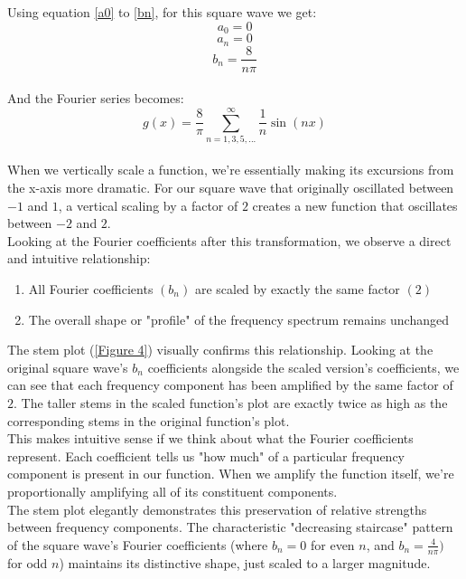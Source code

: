 \documentclass{article}
\begin{document}
Using equation \ref{a0} to \ref{bn}, for this square wave we get:
    \begin{equation}
    a_0 = 0
    \end{equation}
    \begin{equation}
    a_n = 0
    \end{equation}
    \begin{equation}
    b_n = \frac{8}{n\pi}
    \end{equation}\\
And the Fourier series becomes:
    \begin{equation}
g(x) = \frac{8}{\pi} \sum_{n=1,3,5,...}^{\infty} \frac{1}{n} \sin\left(nx\right)
    \end{equation}\\
    
When we vertically scale a function, we're essentially making its excursions from the x-axis more dramatic. For our square wave that originally oscillated between $-1$ and $1$, a vertical scaling by a factor of $2$ creates a new function that oscillates between $-2$ and $2$.\\

Looking at the Fourier coefficients after this transformation, we observe a direct and intuitive relationship:\\

\begin{enumerate}
\item All Fourier coefficients $(b_n)$ are scaled by exactly the same factor $(2)$
\item The overall shape or "profile" of the frequency spectrum remains unchanged
\end{enumerate}
The stem plot (\ref{Figure 4}) visually confirms this relationship. Looking at the original square wave's $b_n$ coefficients alongside the scaled version's coefficients, we can see that each frequency component has been amplified by the same factor of $2$. The taller stems in the scaled function's plot are exactly twice as high as the corresponding stems in the original function's plot.\\

This makes intuitive sense if we think about what the Fourier coefficients represent. Each coefficient tells us "how much" of a particular frequency component is present in our function. When we amplify the function itself, we're proportionally amplifying all of its constituent components.\\

The stem plot elegantly demonstrates this preservation of relative strengths between frequency components. The characteristic "decreasing staircase" pattern of the square wave's Fourier coefficients (where $b_n = 0$ for even $n$, and $b_n = \frac{4}{n\pi})$ for odd $n$) maintains its distinctive shape, just scaled to a larger magnitude.\\
\end{document}
